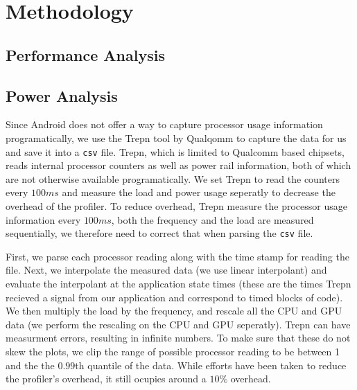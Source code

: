\section{Methodology}


\subsection{Performance Analysis}


\subsection{Power Analysis}


Since Android does not offer a way to capture processor usage information
  programatically, we use the Trepn tool by Qualqomm to capture the
  data for us and save it into a {\tt csv} file.   
Trepn, which is limited to Qualcomm based chipsets, reads internal processor
  counters as well as power rail information, both of which are not otherwise
  available programatically.
We set Trepn to read the counters every $100ms$ and measure the load and power
  usage seperatly to decrease the overhead of the profiler.
To reduce overhead, Trepn measure the processor usage information every $100ms$, both
  the frequency and the load are measured sequentially, we therefore need to 
  correct that when parsing the {\tt csv} file.

  
First, we parse each processor reading along with the time stamp for reading
  the file.
Next, we interpolate the measured data (we use linear interpolant) and
  evaluate the interpolant at the application state times (these are the
  times Trepn recieved a signal from our application and correspond to
  timed blocks of code).
We then multiply the load by the frequency, and rescale all the CPU and GPU data (we perform the rescaling on the CPU and GPU seperatly).
Trepn can have measurment errors, resulting in infinite numbers.
To make sure that these do not skew the plots, we clip the range of possible processor reading to be between 1 and the the $0.99$th quantile of the data.
While efforts have been taken to reduce the profiler's overhead, it still 
  ocupies around a $10\%$ overhead.

